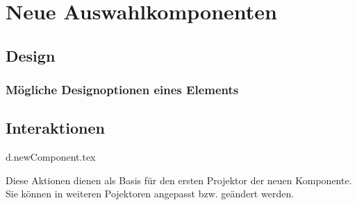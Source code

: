 \chapter{Neue Auswahlkomponenten}

\section{Design}

\subsection{Mögliche Designoptionen eines Elements}



\section{Interaktionen}

{d.newComponent.tex}

Diese Aktionen dienen als Basis für den ersten Projektor der neuen Komponente. 
Sie können in weiteren Pojektoren angepasst bzw. geändert werden.
